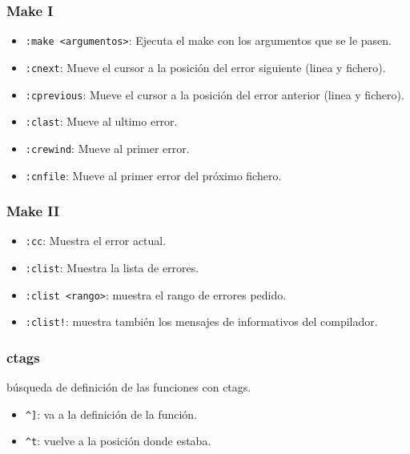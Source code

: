 \documentclass[10pt]{beamer}
\begin{document}
  \begin{frame}[containsverbatim]
    \frametitle{Make I}
    \begin{itemize}
      \item \verb+:make <argumentos>+: Ejecuta el make con los argumentos que se le pasen.
      \item \verb+:cnext+: Mueve el cursor a la posición del error siguiente (linea y fichero).
      \item \verb+:cprevious+: Mueve el cursor a la posición del error anterior (linea y fichero).
      \item \verb+:clast+: Mueve al ultimo error.
      \item \verb+:crewind+: Mueve al primer error.
      \item \verb+:cnfile+: Mueve al primer error del próximo fichero.
    \end{itemize}
  \end{frame}
  
  \begin{frame}[containsverbatim]
    \frametitle{Make II}
    \begin{itemize}
      \item \verb+:cc+: Muestra el error actual.
      \item \verb+:clist+: Muestra la lista de errores.
      \item \verb+:clist <rango>+: muestra el rango de errores pedido.
      \item \verb+:clist!+: muestra también los mensajes de informativos del compilador.
    \end{itemize}
  \end{frame}
  
  \begin{frame}[containsverbatim]
    \frametitle{ctags}
    búsqueda de definición de las funciones con ctags.
    \begin{itemize}
      \item \verb+^]+: va a la definición de la función.
      \item \verb+^t+: vuelve a la posición donde estaba.
    \end{itemize}
  \end{frame}

 
\end{document}

